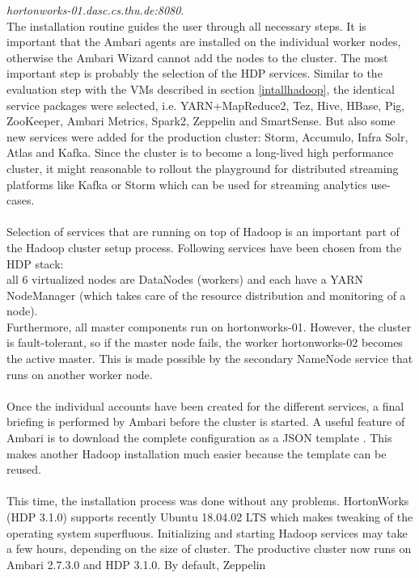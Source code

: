 \emph{hortonworks-01.dasc.cs.thu.de:8080}.\\
The installation routine guides the user through all necessary steps. It
is important that the Ambari agents are installed on the individual worker nodes, otherwise the
Ambari Wizard cannot add the nodes to the cluster. The most important step is probably the
selection of the HDP services. Similar to the evaluation step with the VMs described in section \ref{intallhadoop},
the identical service packages were selected, i.e. YARN+MapReduce2, Tez, Hive, HBase, Pig,
ZooKeeper, Ambari Metrics, Spark2, Zeppelin and SmartSense. But also some new services were
added for the production cluster: Storm, Accumulo, Infra Solr, Atlas and Kafka. Since the cluster
is to become a long-lived high performance cluster, it might reasonable to rollout the playground
for distributed streaming platforms like Kafka or Storm which can be used for streaming analytics
use-cases.\\\\
Selection of services that are running on top of Hadoop is an important part of the Hadoop cluster
setup process. Following services have been chosen from the HDP stack: \\
all 6 virtualized nodes are DataNodes (workers) and each have a YARN NodeManager (which takes care of the resource
distribution and monitoring of a node).\\
Furthermore, all master components run on \glqq hortonworks-01\grqq . However, the cluster is fault-tolerant, so if the master node fails, the worker \glqq hortonworks-02\grqq
becomes the active master. This is made possible by the secondary NameNode service that runs
on another worker node.\\\\
Once the individual accounts have been created for the different services, a final briefing is
performed by Ambari before the cluster is started. A useful feature of Ambari is to download the
complete configuration as a JSON template \cite{RN3}. This makes another Hadoop installation much
easier because the template can be reused.\\\\
This time, the installation process was done without any problems. HortonWorks (HDP 3.1.0)
supports recently Ubuntu 18.04.02 LTS which makes tweaking of the operating system
superfluous. Initializing and starting Hadoop services may take a few hours, depending on the size
of cluster. The productive cluster now runs on Ambari 2.7.3.0 and HDP 3.1.0. By default, Zeppelin
